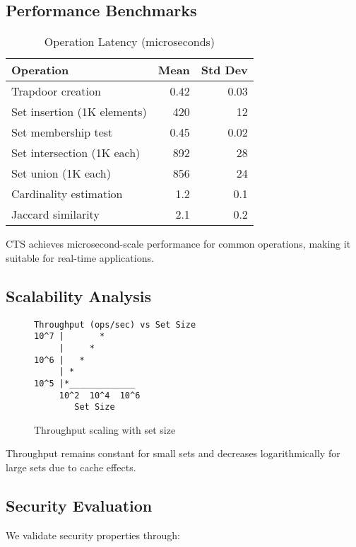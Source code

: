 \documentclass[10pt,conference]{IEEEtran}
\begin{document}
\subsection{Performance Benchmarks}

\begin{table}[h]
\centering
\caption{Operation Latency (microseconds)}
\label{tab:performance}
\begin{tabular}{lrr}
\toprule
Operation & Mean & Std Dev \\
\midrule
Trapdoor creation & 0.42 & 0.03 \\
Set insertion (1K elements) & 420 & 12 \\
Set membership test & 0.45 & 0.02 \\
Set intersection (1K each) & 892 & 28 \\
Set union (1K each) & 856 & 24 \\
Cardinality estimation & 1.2 & 0.1 \\
Jaccard similarity & 2.1 & 0.2 \\
\bottomrule
\end{tabular}
\end{table}

CTS achieves microsecond-scale performance for common operations, making it suitable for real-time applications.

\subsection{Scalability Analysis}

\begin{figure}[h]
\centering
\begin{lstlisting}[language={},basicstyle=\scriptsize\ttfamily,frame=none]
Throughput (ops/sec) vs Set Size
10^7 |       *
     |     *
10^6 |   *
     | *
10^5 |*_____________
     10^2  10^4  10^6
        Set Size
\end{lstlisting}
\caption{Throughput scaling with set size}
\label{fig:scalability}
\end{figure}

Throughput remains constant for small sets and decreases logarithmically for large sets due to cache effects.

\subsection{Security Evaluation}

We validate security properties through:
\end{document}
